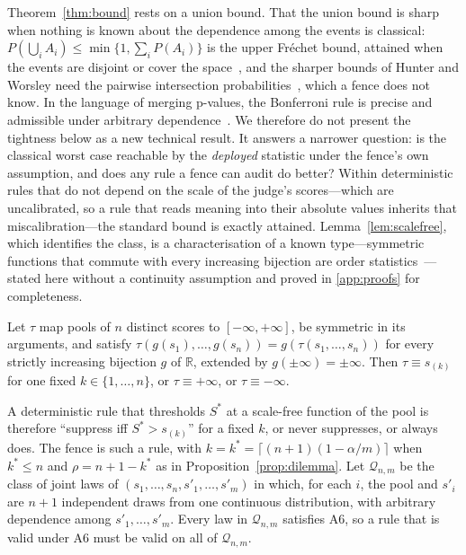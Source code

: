 Theorem~\ref{thm:bound} rests on a union bound. That the union bound is sharp when nothing is known about the dependence among the events is classical: $P(\bigcup_iA_i)\le\min\{1,\sum_iP(A_i)\}$ is the upper Fr\'echet bound, attained when the events are disjoint or cover the space~\cite{frechet1935,ruschendorf1982maxsums,galambos1996bonferroni}, and the sharper bounds of Hunter and Worsley need the pairwise intersection probabilities~\cite{hunter1976union,worsley1982bonferroni}, which a fence does not know. In the language of merging p-values, the Bonferroni rule is precise and admissible under arbitrary dependence~\cite{vovk2020averaging,vovk2022admissible}. We therefore do not present the tightness below as a new technical result. It answers a narrower question: is the classical worst case reachable by the \emph{deployed} statistic under the fence's own assumption, and does any rule a fence can audit do better? Within deterministic rules that do not depend on the scale of the judge's scores---which are uncalibrated, so a rule that reads meaning into their absolute values inherits that miscalibration---the standard bound is exactly attained. Lemma~\ref{lem:scalefree}, which identifies the class, is a characterisation of a known type---symmetric functions that commute with every increasing bijection are order statistics~\cite{ovchinnikov1997invariant,marichal2002order}---stated here without a continuity assumption and proved in \ref{app:proofs} for completeness.

\begin{lemma}\label{lem:scalefree}
Let $\tau$ map pools of $n$ distinct scores to $[-\infty,+\infty]$, be symmetric in its arguments, and satisfy $\tau(g(s_1),\dots,g(s_n))=g(\tau(s_1,\dots,s_n))$ for every strictly increasing bijection $g$ of $\mathbb{R}$, extended by $g(\pm\infty)=\pm\infty$. Then $\tau\equiv s_{(k)}$ for one fixed $k\in\{1,\dots,n\}$, or $\tau\equiv+\infty$, or $\tau\equiv-\infty$.
\end{lemma}

A deterministic rule that thresholds $S^\ast$ at a scale-free function of the pool is therefore ``suppress iff $S^\ast>s_{(k)}$'' for a fixed $k$, or never suppresses, or always does. The fence is such a rule, with $k=k^\ast=\lceil(n+1)(1-\alpha/m)\rceil$ when $k^\ast\le n$ and $\rho=n+1-k^\ast$ as in Proposition~\ref{prop:dilemma}. Let $\mathcal{Q}_{n,m}$ be the class of joint laws of $(s_1,\dots,s_n,s'_1,\dots,s'_m)$ in which, for each $i$, the pool and $s'_i$ are $n+1$ independent draws from one continuous distribution, with arbitrary dependence among $s'_1,\dots,s'_m$. Every law in $\mathcal{Q}_{n,m}$ satisfies A6, so a rule that is valid under A6 must be valid on all of $\mathcal{Q}_{n,m}$.

